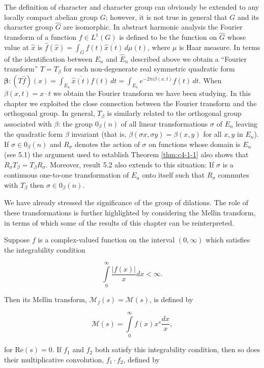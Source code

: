 The definition of character and character group can obviously be extended to any locally compact abelian group $G$; however, it is not true in general that $G$ and its character group $\hat{G}$ are isomorphic. In abstract harmonic analysis the Fourier transform of a function $f \in L^{1}(G)$ is defined to be the function on $\hat{G}$ whose value at $\hat{x}$ is $\hat{f}(\hat{x}) = \int_{G} f(t) \overline{\hat{x}(t)} \, d\mu(t)$, where $\mu$ is Haar measure. In terms of the identification between $E_n$ and $\hat{E}_n$ described above we obtain a ``Fourier transform'' $T = T_\beta$ for each non-degenerate real symmetric quadratic form $\boldsymbol{\beta}: (T\hat{f})(x) = \int_{E_n} \overline{\hat{x}(t)} f(t) \, dt = \int_{E_n} e^{-2\pi i\beta(x,t)} f(t) \, dt$. When $\beta(x,t) = x \cdot t$ we obtain the Fourier transform we have been studying. In this chapter we exploited the close connection between the Fourier transform and the orthogonal group. In general, $T_\beta$ is similarly related to the orthogonal group associated with $\beta$: the group $0_\beta(n)$ of all linear transformations $\sigma$ of $E_n$ leaving the quadratic form $\beta$ invariant (that is, $\beta(\sigma x, \sigma y) = \beta(x, y)$ for all $x, y$ in $E_n$). If $\sigma \in 0_\beta(n)$ and $R_\sigma$ denotes the action of $\sigma$ on functions whose domain is $E_n$ (see 5.1) the argument used to establish Theorem \ref{thm:c4-1-1} also shows that $R_\sigma T_\beta = T_\beta R_\sigma$. Moreover, result 5.2 also extends to this situation: If $\sigma$ is a continuous one-to-one transformation of $E_n$ onto itself such that $R_\sigma$ commutes with $T_\beta$ then $\sigma \in 0_\beta(n)$.

 We have already stressed the significance of the group of dilations. The role of these transformations is further highlighted by considering the Mellin transform, in terms of which some of the results of this chapter can be reinterpreted.

Suppose $f$ is a complex-valued function on the interval $(0, \infty)$ which satisfies the integrability condition

\[
\int\limits_{0}^{\infty}\frac{\left|f(x)\right|}{x}dx<\infty.
\]

Then its Mellin transform, $\mathcal{M}_{f}(s) = \mathcal{M}(s)$, is defined by

\[
\mathcal{M}(s)=\int\limits_{0}^{\infty}f(x)x^{s}\frac{dx}{x},
\]

for $\text{Re}(s) = 0$. If $f_1$ and $f_2$ both satisfy this integrability condition, then so does their multiplicative convolution, $f_1 \cdot f_2$, defined by

